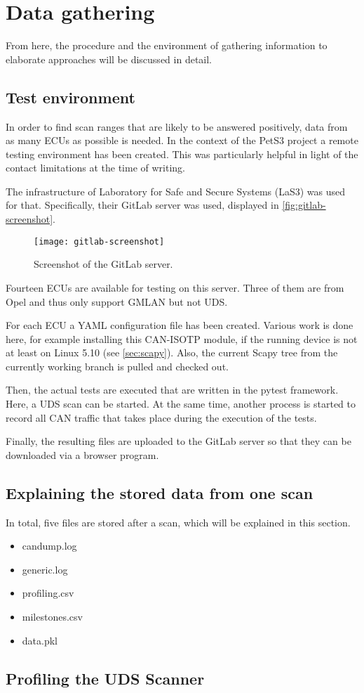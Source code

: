 \section{Data gathering}

From here, the procedure and the environment of gathering information to elaborate approaches will be discussed in detail.

\subsection{Test environment}

In order to find scan ranges that are likely to be answered positively, data from as many ECUs as possible is needed. In the context of the PetS3 project a remote testing environment has been created. This was particularly helpful in light of the contact limitations at the time of writing.

The infrastructure of Laboratory for Safe and Secure Systems (LaS3) was used for that. Specifically, their GitLab server was used, displayed in \autoref{fig:gitlab-screenshot}.

\begin{figure}[h]
    \centering
    \texttt{[image: gitlab-screenshot]}
    \caption{Screenshot of the GitLab server.}
    \label{fig:gitlab-screenshot}
\end{figure}

Fourteen ECUs are available for testing on this server. Three of them are from Opel and thus only support GMLAN but not UDS.

For each ECU a YAML configuration file has been created. Various work is done here, for example installing this CAN-ISOTP module, if the running device is not at least on Linux 5.10 (see \autoref{sec:scapy}). Also, the current Scapy tree from the currently working branch is pulled and checked out.

Then, the actual tests are executed that are written in the pytest framework. Here, a UDS scan can be started. At the same time, another process is started to record all CAN traffic that takes place during the execution of the tests.

Finally, the resulting files are uploaded to the GitLab server so that they can be downloaded via a browser program.

\subsection{Explaining the stored data from one scan}

In total, five files are stored after a scan, which will be explained in this section.

\begin{itemize}
    \item candump.log
    \item generic.log
    \item profiling.csv
    \item milestones.csv
    \item data.pkl
\end{itemize}

\subsection{Profiling the UDS Scanner}
